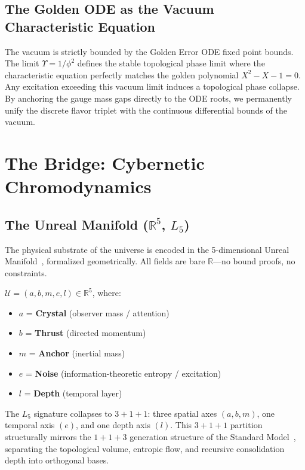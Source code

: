 \subsection{The Golden ODE as the Vacuum Characteristic Equation}
The vacuum is strictly bounded by the Golden Error ODE fixed point bounds. The limit $\Upsilon = 1/\phi^2$ defines the stable topological phase limit where the characteristic equation perfectly matches the golden polynomial $X^2 - X - 1 = 0$. Any excitation exceeding this vacuum limit induces a topological phase collapse. By anchoring the gauge mass gaps directly to the ODE roots, we permanently unify the discrete flavor triplet with the continuous differential bounds of the vacuum.

\section{The Bridge: Cybernetic Chromodynamics}

\subsection{The Unreal Manifold ($\mathbb{R}^5$, $L_5$)}

The physical substrate of the universe is encoded in the 5-dimensional Unreal Manifold~\cite{GoldenTetrahedron}, formalized geometrically. All fields are bare $\mathbb{R}$---no bound proofs, no constraints.

\begin{definition}
$\mathcal{U} = (a, b, m, e, l) \in \mathbb{R}^5$, where:
\begin{itemize}
    \item $a$ = \textbf{Crystal} (observer mass / attention)
    \item $b$ = \textbf{Thrust} (directed momentum)
    \item $m$ = \textbf{Anchor} (inertial mass)
    \item $e$ = \textbf{Noise} (information-theoretic entropy / excitation)
    \item $l$ = \textbf{Depth} (temporal layer)
\end{itemize}
The $L_5$ signature collapses to $3 + 1 + 1$: three spatial axes $(a, b, m)$, one temporal axis $(e)$, and one depth axis $(l)$. This $3+1+1$ partition structurally mirrors the $1+1+3$ generation structure of the Standard Model~\cite{PDG2025}, separating the topological volume, entropic flow, and recursive consolidation depth into orthogonal bases.
\end{definition}


